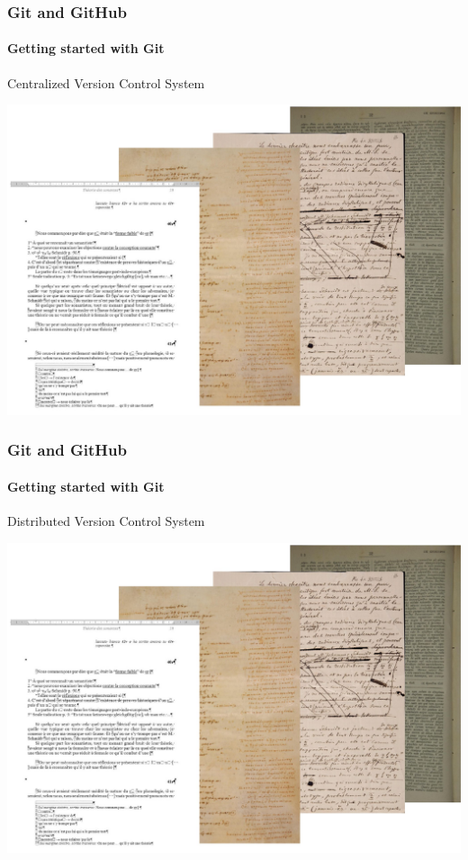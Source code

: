 \begin{frame}
    \frametitle{Git and GitHub}
    \framesubtitle{Getting started with Git}
    \addtocounter{nframe}{1}
    
    \begin{block}{Centralized Version Control System}
        \begin{center}

            \includegraphics[width=.9\textwidth]{imgs/TestiVariSupporti.pdf}
    
        \end{center}
    
    \end{block}

\end{frame}


\begin{frame}
    \frametitle{Git and GitHub}
    \framesubtitle{Getting started with Git}
    \addtocounter{nframe}{1}
    
    \begin{block}{Distributed Version Control System}
        \begin{center}

            \includegraphics[width=.9\textwidth]{imgs/TestiVariSupporti.pdf}
    
        \end{center}
    
    \end{block}

\end{frame}



